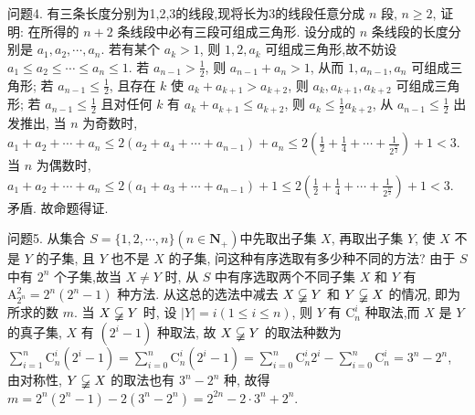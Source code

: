 问题4. 有三条长度分别为1,2,3的线段,现将长为3的线段任意分成 $n$ 段, $n \geqslant 2$, 证明: 在所得的 $n+2$ 条线段中必有三段可组成三角形.
设分成的 $n$ 条线段的长度分别是 $a_1, a_2, \cdots, a_n$. 若有某个 $a_k>1$, 则 $1,2, a_k$ 可组成三角形,故不妨设 $a_1 \leqslant a_2 \leqslant \cdots \leqslant a_n \leqslant 1$. 若 $a_{n-1}>\frac{1}{2}$, 则 $a_{n-1}+a_n>1$, 从而 $1, a_{n-1}, a_n$ 可组成三角形; 若 $a_{n-1} \leqslant \frac{1}{2}$, 且存在 $k$ 使 $a_k+ a_{k+1}>a_{k+2}$, 则 $a_k, a_{k+1}, a_{k+2}$ 可组成三角形; 若 $a_{n-1} \leqslant \frac{1}{2}$ 且对任何 $k$ 有 $a_k+ a_{k+1} \leqslant a_{k+2}$, 则 $a_k \leqslant \frac{1}{2} a_{k+2}$, 从 $a_{n-1} \leqslant \frac{1}{2}$ 出发推出, 当 $n$ 为奇数时, $a_1+a_2+ \cdots+a_n \leqslant 2\left(a_2+a_4+\cdots+a_{n-1}\right)+a_n \leqslant 2\left(\frac{1}{2}+\frac{1}{4}+\cdots+\frac{1}{2^{\frac{n}{2}}}\right)+1<3$. 当 $n$ 为偶数时, $a_1+a_2+\cdots+a_n \leqslant 2\left(a_1+a_3+\cdots+a_{n-1}\right)+1 \leqslant 2\left(\frac{1}{2}+\frac{1}{4}+\cdots+\frac{1}{2^{\frac{n}{2}}}\right)+1<3$. 矛盾.
故命题得证.



问题5. 从集合 $S=\{1,2, \cdots, n\}\left(n \in \mathbf{N}_{+}\right)$中先取出子集 $X$, 再取出子集 $Y$, 使 $X$ 不是 $Y$ 的子集, 且 $Y$ 也不是 $X$ 的子集, 问这种有序选取有多少种不同的方法?
由于 $S$ 中有 $2^n$ 个子集,故当 $X \neq Y$ 时, 从 $S$ 中有序选取两个不同子集 $X$ 和 $Y$ 有 $\mathrm{A}_{2^n}^2=2^n\left(2^n-1\right)$ 种方法.
从这总的选法中减去 $X \varsubsetneqq Y$ 和 $Y \varsubsetneqq X$ 的情况, 即为所求的数 $m$. 当 $X \varsubsetneqq Y$ 时, 设 $|Y|=i(1 \leqslant i \leqslant n)$, 则 $Y$ 有 $\mathrm{C}_n^i$ 种取法,而 $X$ 是 $Y$ 的真子集, $X$ 有 $\left(2^i-1\right)$ 种取法, 故 $X \varsubsetneqq Y$ 的取法种数为 $\sum_{i=1}^n \mathrm{C}_n^i\left(2^i-1\right)=\sum_{i=0}^n \mathrm{C}_n^i\left(2^i-1\right)=\sum_{i=0}^n \mathrm{C}_n^i 2^i-\sum_{i=0}^n \mathrm{C}_n^i=3^n-2^n$, 由对称性, $Y \varsubsetneqq X$ 的取法也有 $3^n-2^n$ 种, 故得 $m=2^n\left(2^n-1\right)-2\left(3^n-2^n\right)=2^{2 n}-2 \cdot 3^n+2^n$.



